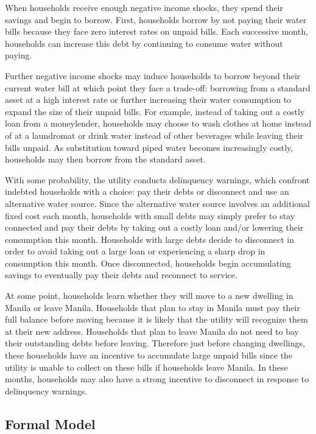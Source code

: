 \documentclass[12pt,table]{article}
\begin{document}
When households receive enough negative income shocks, they spend their savings and begin to borrow.  First, households borrow by not paying their water bills because they face zero interest rates on unpaid bills.  Each successive month, households can increase this debt by continuing to consume water without paying.

Further negative income shocks may induce households to borrow beyond their current water bill at which point they face a trade-off: borrowing from a standard asset at a high interest rate or further increasing their water consumption to expand the size of their unpaid bills.  For example, instead of taking out a costly loan from a moneylender, households may choose to wash clothes at home instead of at a laundromat or drink water instead of other beverages while leaving their bills unpaid.  As substitution toward piped water becomes increasingly costly, households may then borrow from the standard asset.

With some probability, the utility conducts delinquency warnings, which confront indebted households with a choice: pay their debts or disconnect and use an alternative water source.  Since the alternative water source involves an additional fixed cost each month, households with small debts may simply prefer to stay connected and pay their debts by taking out a costly loan and/or lowering their consumption this month.  Households with large debts decide to disconnect in order to avoid taking out a large loan or experiencing a sharp drop in consumption this month.  Once disconnected, households begin accumulating savings to eventually pay their debts and reconnect to service.

At some point, households learn whether they will move to a new dwelling in Manila or leave Manila.  Households that plan to stay in Manila must pay their full balance before moving because it is likely that the utility will recognize them at their new address.  Households that plan to leave Manila do not need to bay their outstanding debts before leaving.  Therefore just before changing dwellings, these households have an incentive to accumulate large unpaid bills since the utility is unable to collect on these bills if households leave Manila.  In these months, households may also have a strong incentive to disconnect in response to delinquency warnings.

\subsection{Formal Model}
\end{document}
